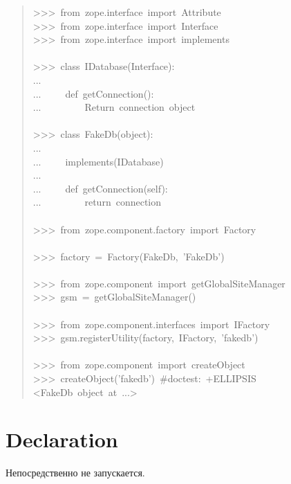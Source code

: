 \documentclass[14pt,a4paper,openany,twoside,final]{extbook}
\begin{document}
\begin{quote}{\ttfamily \raggedright \noindent
>{}>{}>~from~zope.interface~import~Attribute\\
>{}>{}>~from~zope.interface~import~Interface\\
>{}>{}>~from~zope.interface~import~implements\\
~\\
>{}>{}>~class~IDatabase(Interface):\\
...\\
...~~~~~def~getConnection():\\
...~~~~~~~~~\textquotedbl{}\textquotedbl{}\textquotedbl{}Return~connection~object\textquotedbl{}\textquotedbl{}\textquotedbl{}\\
~\\
>{}>{}>~class~FakeDb(object):\\
...\\
...~~~~~implements(IDatabase)\\
...\\
...~~~~~def~getConnection(self):\\
...~~~~~~~~~return~\textquotedbl{}connection\textquotedbl{}\\
~\\
>{}>{}>~from~zope.component.factory~import~Factory\\
~\\
>{}>{}>~factory~=~Factory(FakeDb,~'FakeDb')\\
~\\
>{}>{}>~from~zope.component~import~getGlobalSiteManager\\
>{}>{}>~gsm~=~getGlobalSiteManager()\\
~\\
>{}>{}>~from~zope.component.interfaces~import~IFactory\\
>{}>{}>~gsm.registerUtility(factory,~IFactory,~'fakedb')\\
~\\
>{}>{}>~from~zope.component~import~createObject\\
>{}>{}>~createObject('fakedb')~\#doctest:~+ELLIPSIS\\
<FakeDb~object~at~...>
}
\end{quote}


\section*{Declaration%
  \label{declaration}%
}

Непосредственно не запускается.
\end{document}
